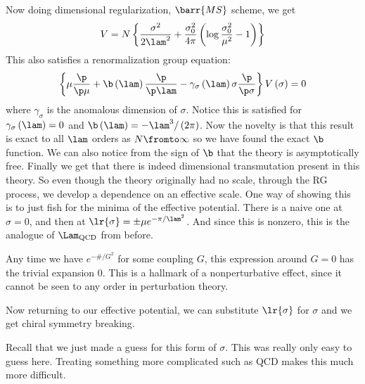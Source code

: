 \documentclass{booc}
\begin{document}
Now doing dimensional regularization, $\barr{MS}$ scheme, we get
\begin{equation}
V = N\left\{ 
\frac{\sigma^2}{2\lam^2} + \frac{\sigma_0^2}{4\pi}
\left( \log \frac{\sigma_0^2}{\mu^2} - 1 \right)
\right\}
\end{equation}
This also satisfies a renormalization group equation:
\begin{equation}
\left\{ 
\mu \frac{\p}{\p\mu} + \b\left( \lam \right) \frac{\p}{\p \lam} - 
\gamma_\sigma\left( \lam \right)\sigma \frac{\p}{\p\sigma}
\right\}V\left( \sigma \right) = 0
\end{equation}
where $\gamma_\sigma$ is the anomalous dimension of $\sigma$.
Notice this is satisfied for $\gamma_\sigma\left( \lam \right) =0$
and $\b\left( \lam \right) = -\lam^3 / \left( 2\pi \right)$.
Now the novelty is that this result is exact to all $\lam$ orders as $N\fromto \infty$
so we have found the exact $\b$ function. 
We can also notice from the sign of $\b$ that the theory is asymptotically free.
Finally we get that there is indeed dimensional transmutation present in this theory.
So even though the theory originally
had no scale, through the RG process, we develop a dependence on an effective scale. 
One way of showing this is to just fish for the minima of the effective potential. 
There is a naive one at $\sigma = 0$, and then at $\lr{\sigma} = \pm \mu e^{-\pi / \lam^2}$.
And since this is nonzero, this is the analogue of $\Lam_{\text{QCD}}$ from before. 
\begin{rmk}
Any time we have $e^{-\# / G^2}$ for some coupling $G$, this expression 
around $G = 0$ has the trivial expansion $0$.
This is a hallmark of a nonperturbative effect, since it cannot be seen to any order in perturbation
theory.
\end{rmk}
Now returning to our effective potential, we can substitute $\lr{\sigma}$ for $\sigma$
and we get chiral symmetry breaking.

Recall that we just made a guess for this form of $\sigma$.
This was really only easy to guess here. 
Treating something more complicated such as QCD makes this much more difficult.
\end{document}
